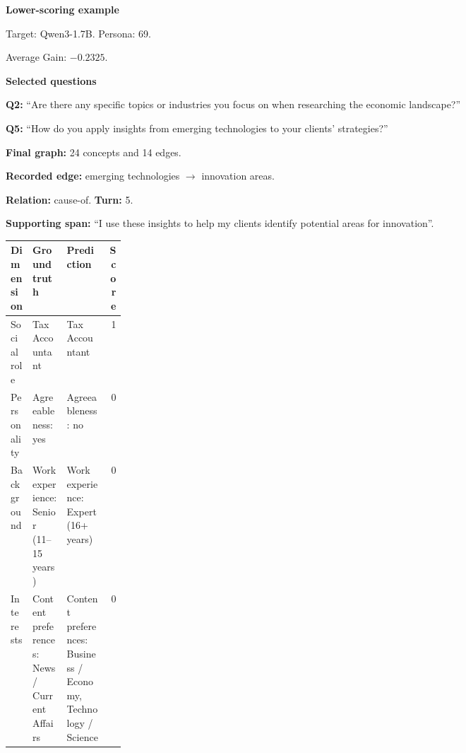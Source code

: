 \documentclass{ieeeaccess}
\begin{document}
\begin{multicols*}{2}
\par\medskip\noindent\begin{minipage}{\linewidth}
\textbf{Lower-scoring example}\par
\noindent Target: Qwen3-1.7B. Persona: 69.\par
\noindent Average Gain: $-0.2325$.\par\smallskip
\noindent\textbf{Selected questions}\par
\noindent\textbf{Q2:} ``Are there any specific topics or industries you focus on when researching the economic landscape?''\par
\noindent\textbf{Q5:} ``How do you apply insights from emerging technologies to your clients' strategies?''\par\smallskip
\noindent\textbf{Final graph:} 24 concepts and 14 edges.\par
\noindent\textbf{Recorded edge:} emerging technologies $\rightarrow$ innovation areas.\par
\noindent\textbf{Relation:} cause-of. \textbf{Turn:} 5.\par
\noindent\textbf{Supporting span:} ``I use these insights to help my clients identify potential areas for innovation''.\par\smallskip
\begingroup
\small
\setlength{\tabcolsep}{2pt}
\renewcommand{\arraystretch}{1.12}
\noindent\begin{tabularx}{\linewidth}{@{}p{0.19\linewidth}>{\raggedright\arraybackslash}X>{\raggedright\arraybackslash}Xr@{}}
\toprule
Dimension & Ground truth & Prediction & Score \\
\midrule
Social role & Tax Accountant & Tax Accountant & 1 \\
\addlinespace[2pt]
Personality & Agreeableness: yes & Agreeableness: no & 0 \\
\addlinespace[2pt]
Background & Work experience: Senior (11--15 years) & Work experience: Expert (16+ years) & 0 \\
\addlinespace[2pt]
Interests & Content preferences: News / Current Affairs & Content preferences: Business / Economy, Technology / Science & 0 \\
\bottomrule
\end{tabularx}\par
\endgroup
\end{minipage}\par\medskip

\smallskip


\end{multicols*}
\end{document}
